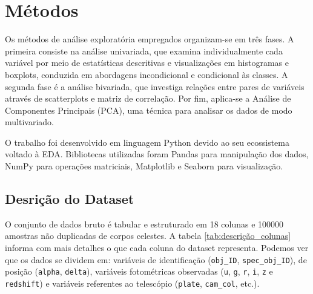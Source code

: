 \documentclass[conference]{IEEEtran}
\begin{document}
\section{Métodos}

Os métodos de análise exploratória empregados organizam-se em três fases. A primeira consiste na análise univariada, que examina individualmente cada variável por meio de estatísticas descritivas e visualizações em histogramas e boxplots, conduzida em abordagens incondicional e condicional às classes. A segunda fase é a análise bivariada, que investiga relações entre pares de variáveis através de scatterplots e matriz de correlação. Por fim, aplica-se a Análise de Componentes Principais (PCA), uma técnica para analisar os dados de modo multivariado.

O trabalho foi desenvolvido em linguagem Python devido ao seu ecossistema voltado à EDA. Bibliotecas utilizadas foram Pandas para manipulação dos dados, NumPy para operações matriciais, Matplotlib e Seaborn para visualização.


\subsection{Desrição do Dataset}

O conjunto de dados bruto é tabular e estruturado em 18 colunas e 100000 amostras não duplicadas de corpos celestes. A tabela \ref{tab:descrição_colunas} informa com mais detalhes o que cada coluna do dataset representa. Podemos ver que os dados se dividem em: variáveis de identificação ({\tt obj\_ID},  {\tt spec\_obj\_ID}), de posição ({\tt alpha}, {\tt delta}), variáveis fotométricas observadas ({\tt u}, {\tt g}, {\tt r}, {\tt i}, {\tt z} e {\tt redshift}) e variáveis referentes ao telescópio ({\tt plate}, {\tt cam\_col}, etc.).
\end{document}
